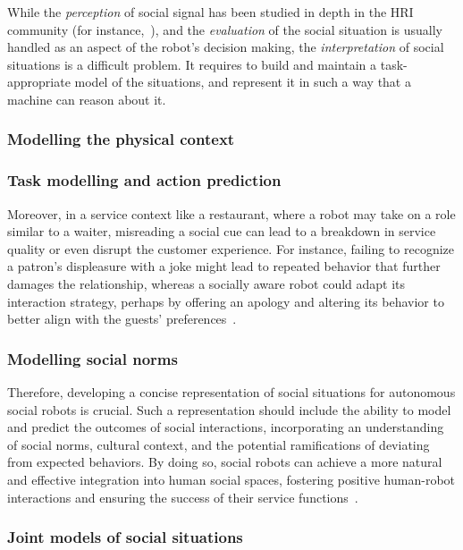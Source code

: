 While the \emph{perception} of social signal has been studied in depth in the
HRI community (for instance,~\cite{pantic2011social}), and the \emph{evaluation} of
the social situation is usually handled as an aspect of the robot's decision
making, the \emph{interpretation} of social situations is a difficult problem.
It requires to build and maintain a task-appropriate model of the situations,
and represent it in such a way that a machine can reason about it.


\subsubsection{Modelling the physical context}

\subsubsection{Task modelling and action prediction}



Moreover, in a service context like a restaurant, where a robot may take on a
role similar to a waiter, misreading a social cue can lead to a breakdown in
service quality or even disrupt the customer experience. For instance, failing
to recognize a patron's displeasure with a joke might lead to repeated behavior
that further damages the relationship, whereas a socially aware robot could
adapt its interaction strategy, perhaps by offering an apology and altering its
behavior to better align with the guests' preferences~\cite{mutlu2006storytelling}.

\subsubsection{Modelling social norms}

Therefore, developing a concise representation of social situations for
autonomous social robots is crucial. Such a representation should include the
ability to model and predict the outcomes of social interactions, incorporating
an understanding of social norms, cultural context, and the potential
ramifications of deviating from expected behaviors. By doing so, social robots
can achieve a more natural and effective integration into human social spaces,
fostering positive human-robot interactions and ensuring the success of their
service functions~\cite{gockley2005designing}.


\subsubsection{Joint models of social situations}



